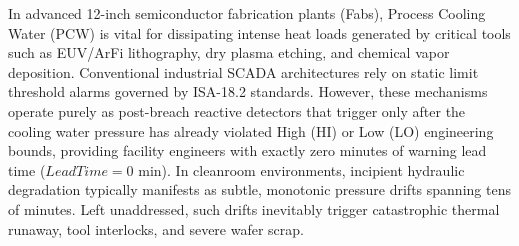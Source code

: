 \documentclass[fontset=none, a4paper, 12pt]{ctexart}
\begin{document}
{\fontsize{12}{18}\selectfont
In advanced 12-inch semiconductor fabrication plants (Fabs), Process Cooling Water (PCW) is vital for dissipating intense heat loads generated by critical tools such as EUV/ArFi lithography, dry plasma etching, and chemical vapor deposition. Conventional industrial SCADA architectures rely on static limit threshold alarms governed by ISA-18.2 standards. However, these mechanisms operate purely as post-breach reactive detectors that trigger only after the cooling water pressure has already violated High (HI) or Low (LO) engineering bounds, providing facility engineers with exactly zero minutes of warning lead time ($LeadTime = 0$ min). In cleanroom environments, incipient hydraulic degradation typically manifests as subtle, monotonic pressure drifts spanning tens of minutes. Left unaddressed, such drifts inevitably trigger catastrophic thermal runaway, tool interlocks, and severe wafer scrap.

}
\end{document}

